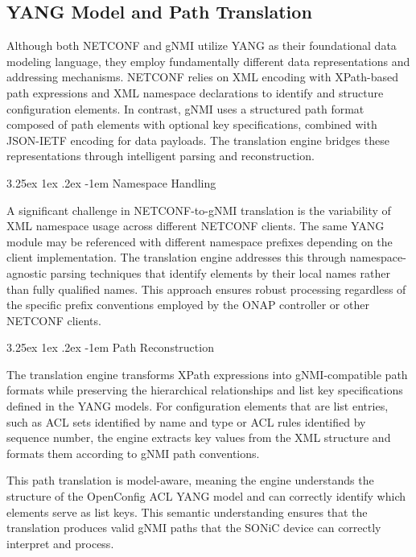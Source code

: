 \documentclass[12pt, a4paper, reqno, oneside]{book}
\makeatletter
\renewcommand\paragraph{\@startsection{paragraph}{5}{\z@}%
  {3.25ex \@plus1ex \@minus.2ex}%
  {-1em}%
  {\normalfont\normalsize\bfseries}}
\makeatother
\begin{document}
\subsection{YANG Model and Path Translation}

\label{sec:yang_mapping}

Although both NETCONF and gNMI utilize YANG as their foundational data modeling language, they employ fundamentally different data representations and addressing mechanisms. NETCONF relies on XML encoding with XPath-based path expressions and XML namespace declarations to identify and structure configuration elements. In contrast, gNMI uses a structured path format composed of path elements with optional key specifications, combined with JSON-IETF encoding for data payloads. The translation engine bridges these representations through intelligent parsing and reconstruction.

\paragraph{Namespace Handling}

A significant challenge in NETCONF-to-gNMI translation is the variability of XML namespace usage across different NETCONF clients. The same YANG module may be referenced with different namespace prefixes depending on the client implementation. The translation engine addresses this through namespace-agnostic parsing techniques that identify elements by their local names rather than fully qualified names. This approach ensures robust processing regardless of the specific prefix conventions employed by the ONAP controller or other NETCONF clients.


\paragraph{Path Reconstruction}

The translation engine transforms XPath expressions into gNMI-compatible path formats while preserving the hierarchical relationships and list key specifications defined in the YANG models. For configuration elements that are list entries, such as ACL sets identified by name and type or ACL rules identified by sequence number, the engine extracts key values from the XML structure and formats them according to gNMI path conventions.

This path translation is model-aware, meaning the engine understands the structure of the OpenConfig ACL YANG model and can correctly identify which elements serve as list keys. This semantic understanding ensures that the translation produces valid gNMI paths that the SONiC device can correctly interpret and process.
\end{document}
